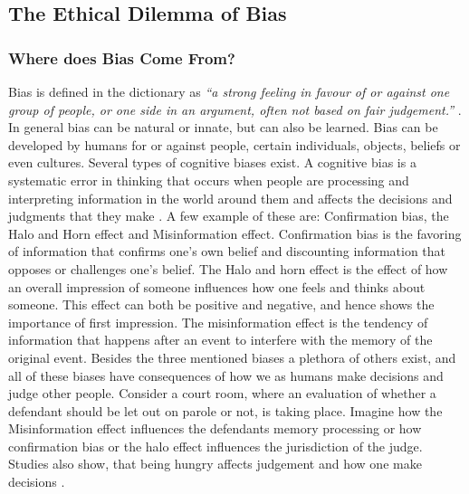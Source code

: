 \documentclass[11pt, fleqn, titlepage]{article}
\begin{document}
	
	\subsection{The Ethical Dilemma of Bias}\label{ethical_dilemma_of_bias}
	
	\subsubsection{Where does Bias Come From?}\label{rootofbias}
	Bias is defined in the dictionary as \textit{\enquote{a strong feeling in favour of or against one group of people, or one side in an argument, often not based on fair judgement.}} \cite{oxford}. In general bias can be natural or innate,  but can also be learned. Bias can be developed by humans for or against people, certain individuals, objects, beliefs or even cultures. Several types of cognitive biases exist. A cognitive bias is a systematic error in thinking that occurs when people are processing and interpreting information in the world around them and affects the decisions and judgments that they make \cite{verywellmind}. A few example of these are: Confirmation bias, the Halo and Horn effect and Misinformation effect. Confirmation bias is the favoring of information that confirms one's own belief and discounting information that opposes or challenges one's belief. The Halo and horn effect is the effect of how an overall impression of someone influences how one feels and thinks about someone. This effect can both be positive and negative, and hence shows the importance of first impression. The misinformation effect is the tendency of information that happens after an event to interfere with the memory of the original event. Besides the three mentioned biases a plethora of others exist, and all of these biases have consequences of how we as humans make decisions and judge other people. Consider a court room, where an evaluation of whether a defendant should be let out on parole or not, is taking place. Imagine how the Misinformation effect influences the defendants memory processing or how confirmation bias or the halo effect influences the jurisdiction of the judge. Studies also show, that being hungry affects judgement  and how one make decisions \cite{eat}. \newline \indent
\end{document}
